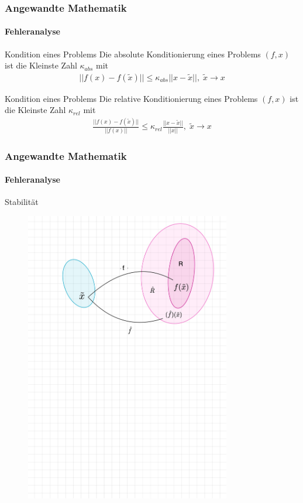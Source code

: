 \documentclass{beamer}
\begin{document}
\begin{frame}
    \frametitle{Angewandte Mathematik}
\framesubtitle{Fehleranalyse}
    \begin{block}{Kondition eines Problems}
Die absolute Konditionierung eines Problems $(f,x)$ ist die Kleinste Zahl $\kappa_{abs}$ mit 
\begin{align*}
|| f(x) - f(\widetilde{x}) || \leq \kappa_{abs} || x - \widetilde{x} || , \;  \widetilde{x} \to x
\end{align*}
\end{block}

    \begin{block}{Kondition eines Problems}
Die relative  Konditionierung eines Problems $(f,x)$ ist die Kleinste Zahl $\kappa_{rel}$ mit 
\begin{align*}
\frac{|| f(x) - f(\widetilde{x}) ||}{||f(x) || } \leq \kappa_{rel} \frac{|| x - \widetilde{x} ||}{||x||} , \; \widetilde{x} \to x
\end{align*}
\end{block}

 \end{frame}






\begin{frame}
    \frametitle{Angewandte Mathematik}
\framesubtitle{Fehleranalyse}
    \begin{block}{Stabilität}
\end{block}
\begin{figure}[H]
      \centering
    \includegraphics[width=0.8\textwidth]{images/stabilitaet}
      \caption{}
\end{figure}
 \end{frame}
\end{document}
